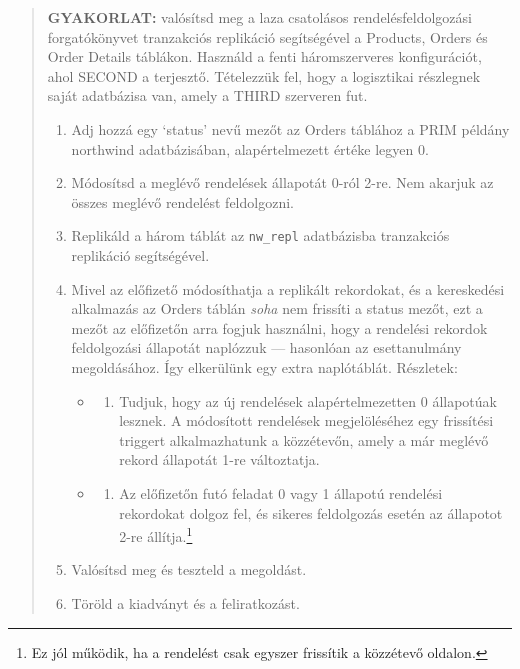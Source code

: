 \documentclass[
  magyar,
]{article}
\providecommand{\tightlist}{%
  \setlength{\itemsep}{0pt}\setlength{\parskip}{0pt}}
\begin{document}
\begin{quote}
\textbf{GYAKORLAT:} valósítsd meg a laza csatolásos rendelésfeldolgozási
forgatókönyvet tranzakciós replikáció segítségével a Products, Orders és
Order Details táblákon. Használd a fenti háromszerveres konfigurációt,
ahol SECOND a terjesztő. Tételezzük fel, hogy a logisztikai részlegnek
saját adatbázisa van, amely a THIRD szerveren fut.

\begin{enumerate}
\def\labelenumi{\arabic{enumi}.}
\tightlist
\item
  Adj hozzá egy `status' nevű mezőt az Orders táblához a PRIM példány
  northwind adatbázisában, alapértelmezett értéke legyen 0.
\item
  Módosítsd a meglévő rendelések állapotát 0-ról 2-re. Nem akarjuk az
  összes meglévő rendelést feldolgozni.
\item
  Replikáld a három táblát az \texttt{nw\_repl} adatbázisba tranzakciós
  replikáció segítségével.
\item
  Mivel az előfizető módosíthatja a replikált rekordokat, és a
  kereskedési alkalmazás az Orders táblán \emph{soha} nem frissíti a
  status mezőt, ezt a mezőt az előfizetőn arra fogjuk használni, hogy a
  rendelési rekordok feldolgozási állapotát naplózzuk --- hasonlóan az
  esettanulmány megoldásához. Így elkerülünk egy extra naplótáblát.
  Részletek:

  \begin{itemize}
  \tightlist
  \item
    \begin{enumerate}
    \def\labelenumii{\alph{enumii}.}
    \tightlist
    \item
      Tudjuk, hogy az új rendelések alapértelmezetten 0 állapotúak
      lesznek. A módosított rendelések megjelöléséhez egy frissítési
      triggert alkalmazhatunk a közzétevőn, amely a már meglévő rekord
      állapotát 1-re változtatja.
    \end{enumerate}
  \item
    \begin{enumerate}
    \def\labelenumii{\alph{enumii}.}
    \setcounter{enumii}{1}
    \tightlist
    \item
      Az előfizetőn futó feladat 0 vagy 1 állapotú rendelési rekordokat
      dolgoz fel, és sikeres feldolgozás esetén az állapotot 2-re
      állítja.\footnote{Ez jól működik, ha a rendelést csak egyszer
        frissítik a közzétevő oldalon.}
    \end{enumerate}
  \end{itemize}
\item
  Valósítsd meg és teszteld a megoldást.
\item
  Töröld a kiadványt és a feliratkozást.
\end{enumerate}
\end{quote}
\end{document}
